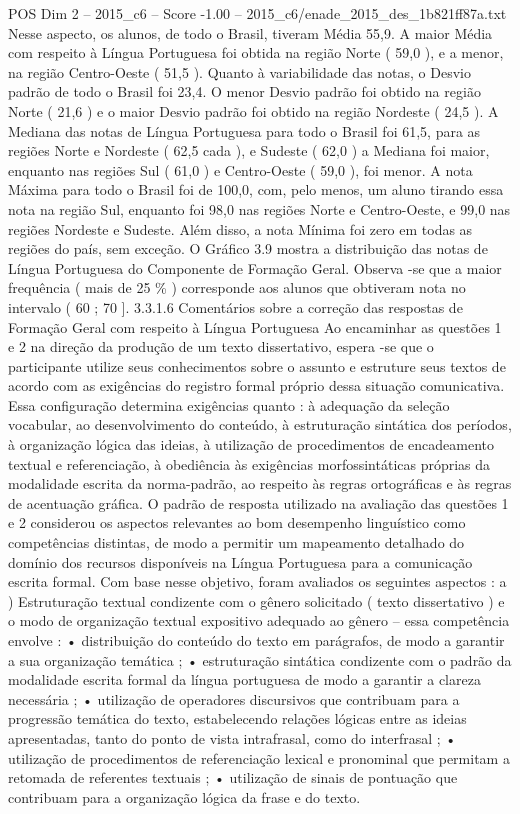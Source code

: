 \begin{textsample}{POS Dim 2 – 2015\_c6 – Score -1.00 – 2015\_c6/enade\_2015\_des\_1b821ff87a.txt}
Nesse aspecto, os alunos, de todo o Brasil, tiveram Média 55,9.
A maior Média com respeito à Língua Portuguesa foi obtida na região Norte ( 59,0 ), e a menor, na região Centro-Oeste ( 51,5 ).
Quanto à variabilidade das notas, o Desvio padrão de todo o Brasil foi 23,4.
O menor Desvio padrão foi obtido na região Norte ( 21,6 ) e o maior Desvio padrão foi obtido na região Nordeste ( 24,5 ).
A Mediana das notas de Língua Portuguesa para todo o Brasil foi 61,5, para as regiões Norte e Nordeste ( 62,5 cada ), e Sudeste ( 62,0 ) a Mediana foi maior, enquanto nas regiões Sul ( 61,0 ) e Centro-Oeste ( 59,0 ), foi menor.
A nota Máxima para todo o Brasil foi de 100,0, com, pelo menos, um aluno tirando essa nota na região Sul, enquanto foi 98,0 nas regiões Norte e Centro-Oeste, e 99,0 nas regiões Nordeste e Sudeste.
Além disso, a nota Mínima foi zero em todas as regiões do país, sem exceção.
O Gráfico 3.9 mostra a distribuição das notas de Língua Portuguesa do Componente de Formação Geral.
Observa -se que a maior frequência ( mais de 25 \% ) corresponde aos alunos que obtiveram nota no intervalo ( 60 ; 70 ]. 3.3.1.6 Comentários sobre a correção das respostas de Formação Geral com respeito à Língua Portuguesa Ao encaminhar as questões 1 e 2 na direção da produção de um texto dissertativo, espera -se que o participante utilize seus conhecimentos sobre o assunto e estruture seus textos de acordo com as exigências do registro formal próprio dessa situação comunicativa.
Essa configuração determina exigências quanto : à adequação da seleção vocabular, ao desenvolvimento do conteúdo, à estruturação sintática dos períodos, à organização lógica das ideias, à utilização de procedimentos de encadeamento textual e referenciação, à obediência às exigências morfossintáticas próprias da modalidade escrita da norma-padrão, ao respeito às regras ortográficas e às regras de acentuação gráfica.
O padrão de resposta utilizado na avaliação das questões 1 e 2 considerou os aspectos relevantes ao bom desempenho linguístico como competências distintas, de modo a permitir um mapeamento detalhado do domínio dos recursos disponíveis na Língua Portuguesa para a comunicação escrita formal.
Com base nesse objetivo, foram avaliados os seguintes aspectos : a ) Estruturação textual condizente com o gênero solicitado ( texto dissertativo ) e o modo de organização textual expositivo adequado ao gênero – essa competência envolve : • distribuição do conteúdo do texto em parágrafos, de modo a garantir a sua organização temática ; • estruturação sintática condizente com o padrão da modalidade escrita formal da língua portuguesa de modo a garantir a clareza necessária ; • utilização de operadores discursivos que contribuam para a progressão temática do texto, estabelecendo relações lógicas entre as ideias apresentadas, tanto do ponto de vista intrafrasal, como do interfrasal ; • utilização de procedimentos de referenciação lexical e pronominal que permitam a retomada de referentes textuais ; • utilização de sinais de pontuação que contribuam para a organização lógica da frase e do texto.

\end{textsample}
